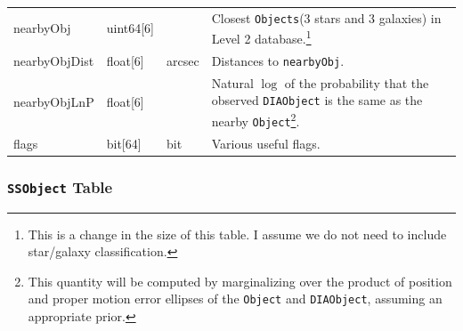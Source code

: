 \documentclass[12pt]{article}
\newcommand{\code}[1]{\texttt{#1}}
\newcommand{\DIAObject}{\code{DIAObject}\xspace}
\newcommand{\DR}{{Level 2 database}\xspace}
\newcommand{\Object}{\code{Object}\xspace}
\newcommand{\Objects}{\code{Objects}\xspace}
\newcommand{\SSObject}{\code{SSObject}\xspace}
\newcommand{\req}[1]{\marginpar{\tiny #1}}
\newcommand{\dmreq}[1]{\req{DMS-REQ-#1}}
\begin{document}
\begin{center}
\begin{longtable}{p{3cm}p{2cm}p{2cm}p{5cm}}
nearbyObj   & uint64[6] & ~ & Closest \Objects (3 stars and 3 galaxies) in \DR.\footnote{\color{magenta} This is a change in the size of this table. I assume we do not need to include star/galaxy classification.} \\

nearbyObjDist   & float[6] & arcsec & Distances to \texttt{nearbyObj}. \\

nearbyObjLnP   & float[6] & ~ &  Natural $\log$ of the probability that the observed \DIAObject is the same as the nearby \Object\footnote{This quantity will be computed by marginalizing over the product of position and proper motion error ellipses of the \Object and \DIAObject, assuming an appropriate prior.}. \\

flags & bit[64] & bit & Various useful flags. \\ \hline

\end{longtable}
\end{center}

\subsubsection{\SSObject Table}

\dmreq{0273}
\end{document}
